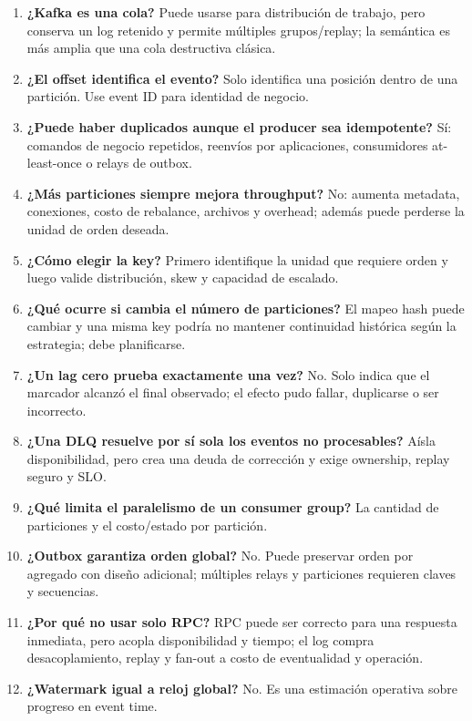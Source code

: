 \documentclass[variant=docente,cover=institutional,mode=screen]{ua-engineering-v6-article}
\begin{document}
\begin{enumerate}
\item \textbf{¿Kafka es una cola?} Puede usarse para distribución de trabajo, pero conserva un log retenido y permite múltiples grupos/replay; la semántica es más amplia que una cola destructiva clásica.
\item \textbf{¿El offset identifica el evento?} Solo identifica una posición dentro de una partición. Use event ID para identidad de negocio.
\item \textbf{¿Puede haber duplicados aunque el producer sea idempotente?} Sí: comandos de negocio repetidos, reenvíos por aplicaciones, consumidores at-least-once o relays de outbox.
\item \textbf{¿Más particiones siempre mejora throughput?} No: aumenta metadata, conexiones, costo de rebalance, archivos y overhead; además puede perderse la unidad de orden deseada.
\item \textbf{¿Cómo elegir la key?} Primero identifique la unidad que requiere orden y luego valide distribución, skew y capacidad de escalado.
\item \textbf{¿Qué ocurre si cambia el número de particiones?} El mapeo hash puede cambiar y una misma key podría no mantener continuidad histórica según la estrategia; debe planificarse.
\item \textbf{¿Un lag cero prueba exactamente una vez?} No. Solo indica que el marcador alcanzó el final observado; el efecto pudo fallar, duplicarse o ser incorrecto.
\item \textbf{¿Una DLQ resuelve por sí sola los eventos no procesables?} Aísla disponibilidad, pero crea una deuda de corrección y exige ownership, replay seguro y SLO.
\item \textbf{¿Qué limita el paralelismo de un consumer group?} La cantidad de particiones y el costo/estado por partición.
\item \textbf{¿Outbox garantiza orden global?} No. Puede preservar orden por agregado con diseño adicional; múltiples relays y particiones requieren claves y secuencias.
\item \textbf{¿Por qué no usar solo RPC?} RPC puede ser correcto para una respuesta inmediata, pero acopla disponibilidad y tiempo; el log compra desacoplamiento, replay y fan-out a costo de eventualidad y operación.
\item \textbf{¿Watermark igual a reloj global?} No. Es una estimación operativa sobre progreso en event time.
\end{enumerate}
\end{document}
